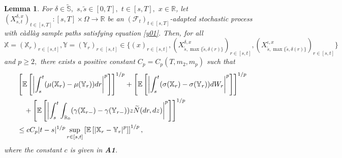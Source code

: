 \documentclass[11pt]{article}
\theoremstyle{theorem}
\newtheorem{Lem}[Def]{Lemma}
\theoremstyle{definition}
\newcommand{\bR}{\mathbb{R}}
\newcommand{\mf}{\mathcal{F}}
\newcommand{\1}{{\bf 1}}
\begin{document}
\begin{Lem}
\label{Lem3.2}
For $\delta \in \widetilde{\mathbb{S}},$ $s, \widetilde{s} \in [0,T],$ $t\in [s, T],$  $x \in\mathbb{R}$, let $(X^{\delta,x}_{s,t})_{t\in[s,T]}:[s,T]  \times\Omega\to\mathbb{R} $ 
be an $(\mf_t)_{t\in[s,T]}$-adapted stochastic process with c\`adl\`ag  sample paths satisfying equation \eqref{y01}. Then, for all $\mathbb{X}=(\mathbb{X}_r)_{r\in [s, t]}, \mathbb{Y}=(\mathbb{Y}_r)_{r\in [s, t]} \in \{ (x)_{r\in [s, t]}, (X_{\widetilde{s},\max\{\widetilde{s},\delta(r)\}}^{\delta,x})_{r\in [s, t]}, (X_{\widetilde{s},\max\{\widetilde{s},\delta (r) \}}^{\iota,x})_{r\in [s, t]}  \}$ and $p\ge 2,$ there exists a positive constant $C_p=C_p(T,m_2,m_p)$ such that
\begin{align*}
&\left[\mathbb{E} \left[\left| \int_s^t (\mu(\mathbb{X}_r)-\mu(\mathbb{Y}_r)) dr \right|^p \right]\right]^{1/p} + \left[\mathbb{E} \left[\left| \int_s^t (\sigma(\mathbb{X}_r)-\sigma(\mathbb{Y}_r)) dW_r \right|^p \right]\right]^{1/p} \notag \\ 
& \quad + \left[\mathbb{E} \left[ \left| \int_s^t \int_{\bR_0} (\gamma(\mathbb{X}_{r-})-\gamma(\mathbb{Y}_{r-})) z \widetilde{N}(dr, dz) \right|^p \right]\right]^{1/p} \notag \\
 & \leq c  C_p  |t-s|^{1/p} \sup_{r\in [s, t]} \left[ \mathbb{E} \left[\left| \mathbb{X}_r-\mathbb{Y}_r \right|^p \right]\right]^{1/p},
\end{align*}
where the constant $c$ is given in {\bf A1}.
\end{Lem}
\end{document}

